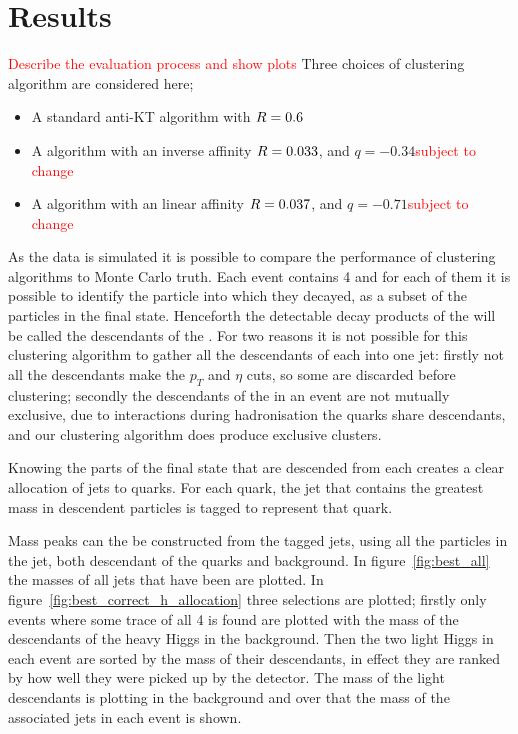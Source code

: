 \section{Results}
\textcolor{red}{Describe the evaluation process and show plots}
Three choices of clustering algorithm are considered here;
\begin{itemize}
    \item A standard anti-KT algorithm with \(R{}=0.6\) %
    \item A \spectralmeanjet{} algorithm with an inverse affinity \(R{}=0.033\), and \(q=-0.34\)\textcolor{red}{subject to change}
    \item A \spectralfulljet{} algorithm with an linear affinity \(R{}=0.037\), and \(q=-0.71\)\textcolor{red}{subject to change}
\end{itemize}

As the data is simulated it is possible to compare the performance of clustering algorithms to Monte Carlo truth.
Each event contains 4  and for each of them it is possible to identify the particle into which they decayed, as a subset of the particles in the final state.
Henceforth the detectable decay products of the  will be called the descendants of the .
For two reasons it is not possible for this clustering algorithm to gather all the descendants
of each  into one jet:
firstly not all the descendants make the \(p_T\) and \(\eta\) cuts, so some are discarded  before clustering;
secondly the descendants of the  in an event are not mutually exclusive, due to interactions during hadronisation the quarks share descendants, and our clustering algorithm does produce exclusive clusters.

Knowing the parts of the final state that are descended from each  creates a clear
allocation of jets to quarks.
For each quark, the jet that contains the greatest mass in descendent particles is tagged to represent that quark.

Mass peaks can the be constructed from the tagged jets, using all the particles in the jet,
both descendant of the quarks and background.
In figure~\ref{fig:best_all} the masses of all jets that have been  are plotted.
In figure~\ref{fig:best_correct_h_allocation} three selections are plotted; firstly only events where some trace of all 4  is found
are plotted with the mass of the descendants of the heavy Higgs in the background.
Then the two light Higgs in each event are sorted by the mass of their descendants,
in effect they are ranked by how well they were picked up by the detector.
The mass of the light descendants is plotting in the background and over
that the mass of the associated jets in each event is shown.


